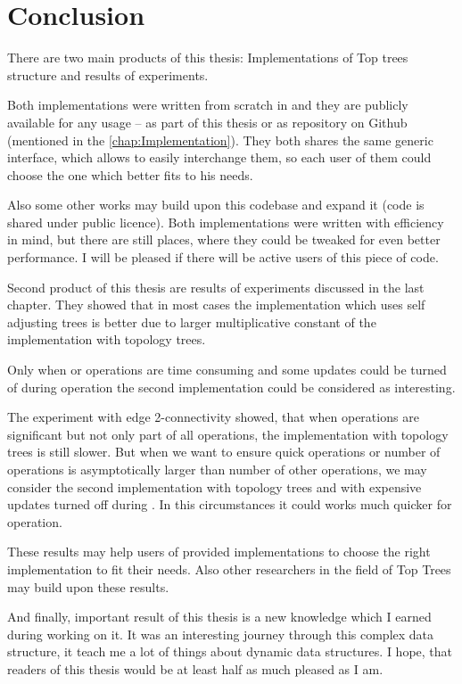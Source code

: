 \chapter*{Conclusion}

There are two main products of this thesis: Implementations of Top trees
structure and results of experiments.

Both implementations were written from scratch in \Cpp{} and they are publicly
available for any usage -- as part of this thesis or as repository on Github
(mentioned in the \cref{chap:Implementation}). They both shares the same generic
interface, which allows to easily interchange them, so each user of them could
choose the one which better fits to his needs.

Also some other works may build upon this codebase and expand it (code is shared
under public licence). Both implementations were written with efficiency in
mind, but there are still places, where they could be tweaked for even better
performance. I will be pleased if there will be active users of this piece of
code.

\bigskip

Second product of this thesis are results of experiments discussed in the last
chapter. They showed that in most cases the implementation which uses self
adjusting trees is better due to larger multiplicative constant of the
implementation with topology trees.

Only when \Join{} or \Split{} operations are time consuming and some updates
could be turned of during \Expose{} operation the second implementation could
be considered as interesting.

The experiment with edge 2-connectivity showed, that when \Expose{} operations
are significant but not only part of all operations, the implementation with
topology trees is still slower. But when we want to ensure quick \Expose{}
operations or number of \Expose{} operations is asymptotically larger than
number of other operations, we may consider the second implementation with
topology trees and with expensive updates turned off during \Expose{}. In this
circumstances it could works much quicker for \Expose{} operation.

These results may help users of provided implementations to choose the right
implementation to fit their needs. Also other researchers in the field of Top
Trees may build upon these results.

\bigskip

And finally, important result of this thesis is a new knowledge which I earned
during working on it. It was an interesting journey through this complex data
structure, it teach me a lot of things about dynamic data structures. I hope,
that readers of this thesis would be at least half as much pleased as I am.
